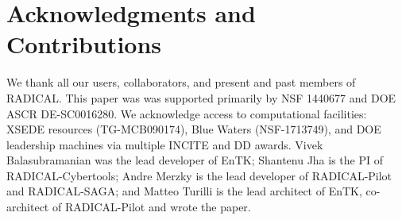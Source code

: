 \documentclass[preprint,12pt, a4paper]{elsarticle}
\begin{document}





\section*{Acknowledgments and Contributions}

We thank all our users, collaborators, and present and past members of
RADICAL\@. This paper was was supported primarily by NSF 1440677 and DOE ASCR
{DE-SC0016280}. We acknowledge access to computational facilities: XSEDE
resources (TG-MCB090174), Blue Waters (NSF-1713749), and DOE leadership machines
via multiple INCITE and DD awards. Vivek Balasubramanian was the lead developer
of EnTK\@; Shantenu Jha is the PI of RADICAL-Cybertools; Andre Merzky is the
lead developer of RADICAL-Pilot and RADICAL-SAGA\@; and Matteo Turilli is the
lead architect of EnTK, co-architect of RADICAL-Pilot and wrote the paper.
\end{document}
